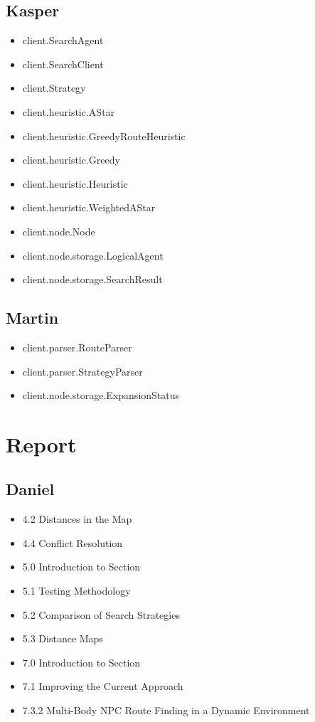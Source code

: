 \documentclass[10pt,a4paper]{article}
\begin{document}
	\subsection{Kasper}
		\begin{itemize}
			\item client.SearchAgent
			\item client.SearchClient
			\item client.Strategy
			\item client.heuristic.AStar
			\item client.heuristic.GreedyRouteHeuristic
			\item client.heuristic.Greedy
			\item client.heuristic.Heuristic
			\item client.heuristic.WeightedAStar
			\item client.node.Node
			\item client.node.storage.LogicalAgent
			\item client.node.storage.SearchResult
		\end{itemize}
	\subsection{Martin}
		\begin{itemize}
			\item client.parser.RouteParser
			\item client.parser.StrategyParser
			\item client.node.storage.ExpansionStatus
		\end{itemize}

\section{Report}
	\subsection{Daniel}
		\begin{itemize}
			\item 4.2 Distances in the Map
			\item 4.4 Conflict Resolution
			\item 5.0 Introduction to Section
			\item 5.1 Testing Methodology
			\item 5.2 Comparison of Search Strategies
			\item 5.3 Distance Maps
			\item 7.0 Introduction to Section
			\item 7.1 Improving the Current Approach
			\item 7.3.2 Multi-Body NPC Route Finding in a Dynamic Environment
		\end{itemize}
\end{document}
